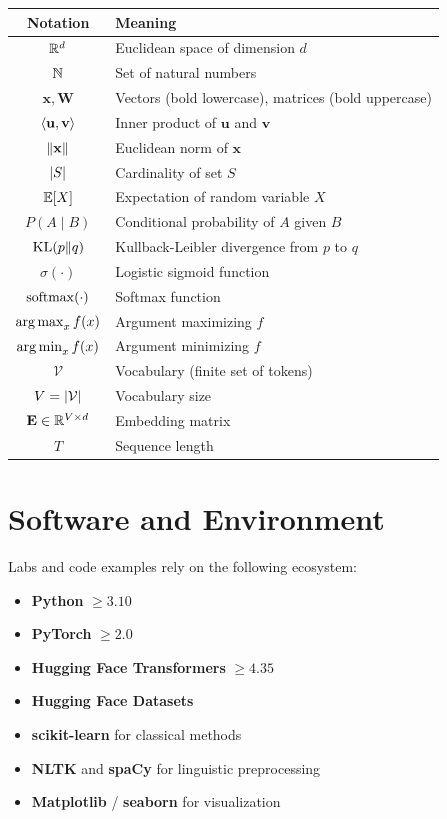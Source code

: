 \begin{center}
\renewcommand{\arraystretch}{1.3}
\begin{tabular}{cl}
\toprule
\textbf{Notation} & \textbf{Meaning} \\
\midrule
$\mathbb{R}^d$ & Euclidean space of dimension $d$ \\
$\mathbb{N}$ & Set of natural numbers \\
$\mathbf{x}, \mathbf{W}$ & Vectors (bold lowercase), matrices (bold uppercase) \\
$\langle \mathbf{u}, \mathbf{v} \rangle$ & Inner product of $\mathbf{u}$ and $\mathbf{v}$ \\
$\left\| \mathbf{x} \right\|$ & Euclidean norm of $\mathbf{x}$ \\
$\left| S \right|$ & Cardinality of set $S$ \\
$\mathbb{E}[X]$ & Expectation of random variable $X$ \\
$P(A \mid B)$ & Conditional probability of $A$ given $B$ \\
$\mathrm{KL}(p \| q)$ & Kullback-Leibler divergence from $p$ to $q$ \\
$\sigma(\cdot)$ & Logistic sigmoid function \\
$\operatorname{softmax}(\cdot)$ & Softmax function \\
$\operatorname*{arg\,max}_x f(x)$ & Argument maximizing $f$ \\
$\operatorname*{arg\,min}_x f(x)$ & Argument minimizing $f$ \\
$\mathcal{V}$ & Vocabulary (finite set of tokens) \\
$V = \left| \mathcal{V} \right|$ & Vocabulary size \\
$\mathbf{E} \in \mathbb{R}^{V \times d}$ & Embedding matrix \\
$T$ & Sequence length \\
\bottomrule
\end{tabular}
\end{center}

\section*{Software and Environment}

Labs and code examples rely on the following ecosystem:

\begin{itemize}
    \item \textbf{Python} $\geq 3.10$
    \item \textbf{PyTorch} $\geq 2.0$
    \item \textbf{Hugging Face Transformers} $\geq 4.35$
    \item \textbf{Hugging Face Datasets}
    \item \textbf{scikit-learn} for classical methods
    \item \textbf{NLTK} and \textbf{spaCy} for linguistic preprocessing
    \item \textbf{Matplotlib} / \textbf{seaborn} for visualization
\end{itemize}

